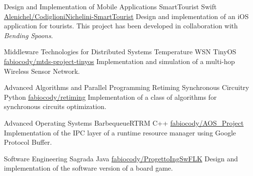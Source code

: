 

\begin{cventries}

\cventry
    {Design and Implementation of Mobile Applications}
    {SmartTourist}
    {Swift}
    {\href{https://github.com/Alenichel/CodiglioniNichelini-SmartTourist}{\faGithub\acvHeaderIconSep Alenichel/CodiglioniNichelini-SmartTourist}}
    {Design and implementation of an iOS application for tourists. This project has been developed in collaboration with \textit{Bending Spoons}.}
    
\cventry
    {Middleware Technologies for Distributed Systems}
    {Temperature WSN}
    {TinyOS}
    {\href{https://github.com/fabiocody/mtds-project-tinyos}{\faGithub\acvHeaderIconSep fabiocody/mtds-project-tinyos}}
    {Implementation and simulation of a multi-hop Wireless Sensor Network.}
    
    
\cventry
    {Advanced Algorithms and Parallel Programming}
    {Retiming Synchronous Circuitry}
    {Python}
    {\href{https://github.com/fabiocody/retiming}{\faGithub\acvHeaderIconSep fabiocody/retiming}}
    {Implementation of a class of algorithms for synchronous circuits optimization.}
    
\cventry
    {Advanced Operating Systems}
    {BarbequeueRTRM}
    {C++}
    {\href{https://github.com/fabiocody/AOS\_Project/tree/protobuf}{\faGithub\acvHeaderIconSep fabiocody/AOS\_Project}}
    {Implementation of the IPC layer of a runtime resource manager using Google Protocol Buffer.}
    
\cventry
    {Software Engineering}
    {Sagrada}
    {Java}
    {\href{https://github.com/fabiocody/ProgettoIngSwFLK}{\faGithub\acvHeaderIconSep fabiocody/ProgettoIngSwFLK}}
    {Design and implementation of the software version of a board game.}
\end{cventries}
